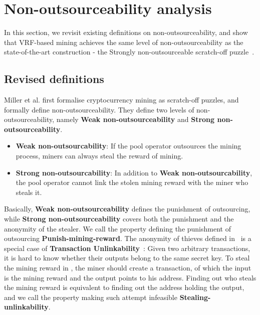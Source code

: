 \section{Non-outsourceability analysis}
\label{sec:non_outsourceability}

In this section, we revisit existing definitions on non-outsourceability, and show that VRF-based mining achieves the same level of non-outsourceability as the state-of-the-art construction - the Strongly non-outsourceable scratch-off puzzle~\cite{miller2015nonoutsourceable}.

\subsection{Revised definitions}

Miller et al. \cite{miller2015nonoutsourceable} first formalise cryptocurrency mining as scratch-off puzzles, and formally define non-outsourceability.
They define two levels of non-outsourceability, namely \textbf{Weak non-outsourceability} and \textbf{Strong non-outsourceability}.

\begin{itemize}
    \item \textbf{Weak non-outsourcability}: If the pool operator outsources the mining process, miners can always steal the reward of mining.
    \item \textbf{Strong non-outsourcability}: In addition to \textbf{Weak non-outsourcability}, the pool operator cannot link the stolen mining reward with the miner who steals it.
\end{itemize}

Basically, \textbf{Weak non-outsourceability} defines the punishment of outsourcing, while \textbf{Strong non-outsourceability} covers both the punishment and the anonymity of the stealer.
We call the property defining the punishment of outsourcing \textbf{Punish-mining-reward}.
The anonymity of thieves defined in~\cite{miller2015nonoutsourceable} is a special case of \textbf{Transaction Unlinkability}~\cite{van2013cryptonote}: Given two arbitrary transactions, it is hard to know whether their outputs belong to the same secret key.
To steal the mining reward in \cite{miller2015nonoutsourceable}, the miner should create a transaction, of which the input is the mining reward and the output points to his address.
Finding out who steals the mining reward is equivalent to finding out the address holding the output, and we call the property making such attempt infeasible \textbf{Stealing-unlinkability}.




